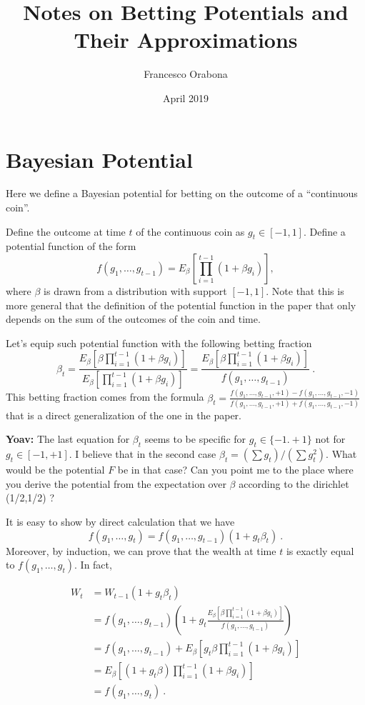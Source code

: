 \documentclass{article}
\title{Notes on Betting Potentials and Their Approximations}
\author{Francesco Orabona}
\date{April 2019}
\begin{document}
\maketitle

\section{Bayesian Potential}

Here we define a Bayesian potential for betting on the outcome of a ``continuous coin''.

Define the outcome at time $t$ of the continuous coin as $g_t \in [-1,1]$.
Define a potential function of the form
\[
f(g_1, \dots, g_{t-1})=E_{\beta} \left[\prod_{i=1}^{t-1}(1+\beta g_i) \right],
\]
where $\beta$ is drawn from a distribution with support $[-1,1]$.
Note that this is more general that the definition of the potential function in the paper that only depends on the sum of the outcomes of the coin and time.

Let's equip such potential function with the following betting fraction
\[
\beta_t 
= \frac{E_\beta[\beta \prod_{i=1}^{t-1}(1+\beta g_i)]}{E_\beta[\prod_{i=1}^{t-1}(1+\beta g_i)]}
= \frac{E_\beta[\beta \prod_{i=1}^{t-1}(1+\beta g_i)]}{f(g_1, \dots, g_{t-1})}~.
\]
This betting fraction comes from the formula $\beta_t=\frac{f(g_1, \dots, g_{t-1},+1)-f(g_1, \dots, g_{t-1},-1)}{f(g_1, \dots, g_{t-1},+1)+f(g_1, \dots, g_{t-1},-1)}$ that is a direct generalization of the one in the paper.

{\bf Yoav:} The last equation for $\beta_t$ seems to be specific for $g_t \in \{-1.+1\}$ not for $g_t \in [-1,+1]$. I believe that in the second case $\beta_t = (\sum g_t)/(\sum g_t^2)$. What would be the potential $F$ be in that case? Can you point me to the place where you derive the potential from the expectation over $\beta$ according to the dirichlet (1/2,1/2) ?

It is easy to show by direct calculation that we have
\[
f(g_1,\dots, g_t)=f(g_1, \dots, g_{t-1})(1+g_t \beta_t)~.
\]
Moreover, by induction, we can prove that the wealth at time $t$ is exactly equal to $f(g_1,\dots, g_t)$. In fact,

\begin{align*}
W_t
&=W_{t-1}(1+g_t \beta_t) \\
&=f(g_1, \dots, g_{t-1})\left(1+g_t \frac{E_\beta[\beta \prod_{i=1}^{t-1}(1+\beta g_i)]}{f(g_1, \dots, g_{t-1})}\right) \\
&= f(g_1, \dots, g_{t-1})+ E_\beta\left[g_t \beta \prod_{i=1}^{t-1}(1+\beta g_i)\right] \\
&=E_\beta\left[(1+g_t \beta) \prod_{i=1}^{t-1}(1+\beta g_i)\right] \\
&= f(g_1, \dots, g_{t})~.
\end{align*}
\end{document}
